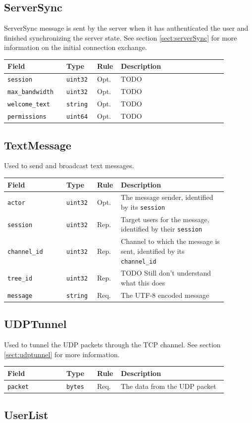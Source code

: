\documentclass[11pt]{article} %
\newenvironment{mumbleMessageEx}
{%
	\small
	\renewcommand\arraystretch{1.5}
	\begin{tabular}{p{0.25\linewidth}p{0.13\linewidth}p{0.05\linewidth}p{0.45\linewidth}}
	Field & Type & Rule & Description \\
	\hline
}
{%
	\end{tabular}
	\renewcommand\arraystretch{1.0}
}
\newcommand{\mumbleMessageExItem}[4]{ \texttt{#1} & \texttt{#2} & #3 & #4 \\ }
\begin{document}
\subsection{ServerSync}

ServerSync message is sent by the server when it has authenticated the user and finished synchronizing the server state. See section \ref{sect:serverSync} for more information on the initial connection exchange.

\begin{mumbleMessageEx}
\mumbleMessageExItem{session}{uint32}{Opt.}{TODO}
\mumbleMessageExItem{max\_bandwidth}{uint32}{Opt.}{TODO}
\mumbleMessageExItem{welcome\_text}{string}{Opt.}{TODO}
\mumbleMessageExItem{permissions}{uint64}{Opt.}{TODO}
\end{mumbleMessageEx}

\subsection{TextMessage}

Used to send and broadcast text messages.

\begin{mumbleMessageEx}
\mumbleMessageExItem{actor}{uint32}{Opt.}{The message sender, identified by its \texttt{session}}
\mumbleMessageExItem{session}{uint32}{Rep.}{Target users for the message, identified by their \texttt{session}}
\mumbleMessageExItem{channel\_id}{uint32}{Rep.}{Channel to which the message is sent, identified by its \texttt{channel\_id}}
\mumbleMessageExItem{tree\_id}{uint32}{Rep.}{TODO Still don't understand what this does}
\mumbleMessageExItem{message}{string}{Req.}{The UTF-8 encoded message}
\end{mumbleMessageEx}

\subsection{UDPTunnel}

Used to tunnel the UDP packets through the TCP channel. See section \ref{sect:udptunnel} for more information.

\begin{mumbleMessageEx}
\mumbleMessageExItem{packet}{bytes}{Req.}{The data from the UDP packet}
\end{mumbleMessageEx}

\subsection{UserList}
\end{document}
